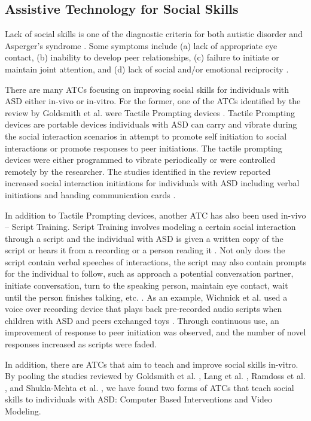 \documentclass{ut-thesis}
\begin{document}
\subsection{Assistive Technology for Social Skills}
Lack of social skills is one of the diagnostic criteria for both autistic disorder and Asperger's syndrome \cite{spitzer1980diagnostic}.  Some symptoms include (a) lack of appropriate eye contact, (b) inability to develop peer relationships, (c) failure to initiate or maintain joint attention, and (d) lack of social and/or emotional reciprocity \cite{rao2008social}.

There are many ATCs focusing on improving social skills for individuals with ASD either in-vivo or in-vitro.  For the former, one of the ATCs identified by the review by Goldsmith et al. were Tactile Prompting devices \cite{goldsmith2004use}.  Tactile Prompting devices are portable devices individuals with ASD can carry and vibrate during the social interaction scenarios in attempt to promote self initiation to social interactions or promote responses to peer initiations.  The tactile prompting devices were either programmed to vibrate periodically or were controlled remotely by the researcher.  The studies identified in the review reported increased social interaction initiations for individuals with ASD including verbal initiations \cite{shabani2002increasing, taylor1998teaching} and handing communication cards \cite{taylor2004teaching}.

In addition to Tactile Prompting devices, another ATC has also been used in-vivo -- Script Training.  Script Training involves modeling a certain social interaction through a script and the individual with ASD is given a written copy of the script or hears it from a recording or a person reading it \cite{stevenson2000social}.  Not only does the script contain verbal speeches of interactions, the script may also contain prompts for the individual to follow, such as approach a potential conversation partner, initiate conversation, turn to the speaking person, maintain eye contact, wait until the person finishes talking, etc. \cite{wichnick2010effect}.  As an example, Wichnick et al. used a voice over recording device that plays back pre-recorded audio scripts when children with ASD and peers exchanged toys \cite{wichnick2010effect}.  Through continuous use, an improvement of response to peer initiation was observed, and the number of novel responses increased as scripts were faded.

In addition, there are ATCs that aim to teach and improve social skills in-vitro.  By pooling the studies reviewed by Goldsmith et al. \cite{goldsmith2004use}, Lang et al. \cite{lang2014assistive}, Ramdoss et al. \cite{ramdoss2012computer}, and  Shukla-Mehta et al. \cite{shukla2009evaluating}, we have found two forms of ATCs that teach social skills to individuals with ASD: Computer Based Interventions and Video Modeling.
\end{document}
